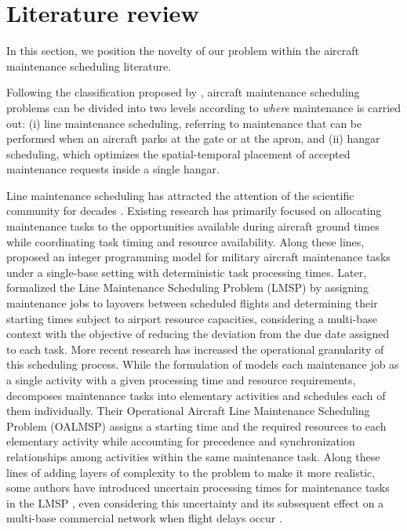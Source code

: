\section{Literature review}
\label{sec:lit_review}
In this section, we position the novelty of our problem within the aircraft maintenance scheduling literature.

Following the classification proposed by \citet{van2013aircraft}, aircraft maintenance scheduling problems can be divided into two levels according to \emph{where} maintenance is carried out: (i) line maintenance scheduling, referring to maintenance that can be performed when an aircraft parks at the gate or at the apron, and (ii) hangar scheduling, which optimizes the spatial-temporal placement of accepted maintenance requests inside a single hangar.

Line maintenance scheduling has attracted the attention of the scientific community for decades \citep{rodrigo_line_maintenance_2026}. Existing research has primarily focused on allocating maintenance tasks to the opportunities available during aircraft ground times while coordinating task timing and resource availability. Along these lines, \citet{safaei2011workforce} proposed an integer programming model for military aircraft maintenance tasks under a single-base setting with deterministic task processing times. Later, \citet{Shaukat2020} formalized the Line Maintenance Scheduling Problem (LMSP) by assigning maintenance jobs to layovers between scheduled flights and determining their starting times subject to airport resource capacities, considering a multi-base context with the objective of reducing the deviation from the due date assigned to each task. More recent research has increased the operational granularity of this scheduling process. While the formulation of \citet{Shaukat2020} models each maintenance job as a single activity with a given processing time and resource requirements, \citet{SCIAU2024102537} decomposes maintenance tasks into elementary activities and schedules each of them individually. Their Operational Aircraft Line Maintenance Scheduling Problem (OALMSP) assigns a starting time and the required resources to each elementary activity while accounting for precedence and synchronization relationships among activities within the same maintenance task. Along these lines of adding layers of complexity to the problem to make it more realistic, some authors have introduced uncertain processing times for maintenance tasks in the LMSP \citep{Shahmoradi-Moghadam2021}, even considering this uncertainty and its subsequent effect on a multi-base commercial network when flight delays occur \citep{VILLAFRANCA2025104012}.

